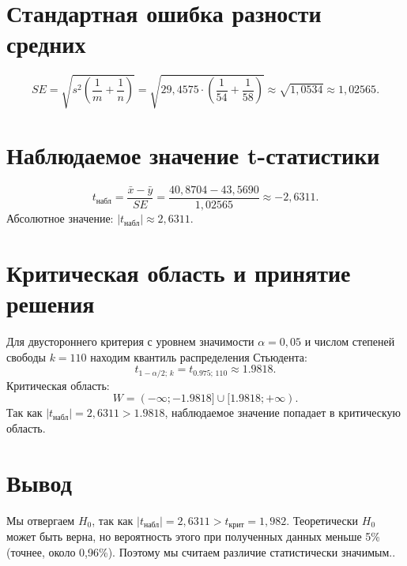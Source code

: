 \documentclass[a4paper,12pt]{article}
\begin{document}
\section*{Стандартная ошибка разности средних}
\[
SE = \sqrt{s^2\left(\frac{1}{m} + \frac{1}{n}\right)} = \sqrt{29,4575 \cdot \left(\frac{1}{54} + \frac{1}{58}\right)} \approx \sqrt{1,0534} \approx 1,02565.
\]

\section*{Наблюдаемое значение t-статистики}
\[
t_{\text{набл}} = \frac{\bar{x} - \bar{y}}{SE} = \frac{40,8704 - 43,5690}{1,02565} \approx -2,6311.
\]
Абсолютное значение: $|t_{\text{набл}}| \approx 2,6311$.

\section*{Критическая область и принятие решения}
Для двустороннего критерия с уровнем значимости $\alpha = 0,05$ и числом степеней свободы $k = 110$ находим квантиль распределения Стьюдента:
\[
t_{1-\alpha/2;\, k} = t_{0.975;\, 110} \approx 1.9818.
\]
Критическая область:
\[
W = (-\infty; -1.9818] \cup [1.9818; +\infty).
\]
Так как $|t_{\text{набл}}| = 2,6311 > 1.9818$, наблюдаемое значение попадает в критическую область.

\section*{Вывод}
Мы отвергаем $H_0$, так как $|t_{\text{набл}}| = 2,6311 > t_{\text{крит}} = 1,982$. Теоретически $H_0$ может быть верна, но вероятность этого при полученных данных меньше 5\% (точнее, около 0,96\%). Поэтому мы считаем различие статистически значимым..
\end{document}
